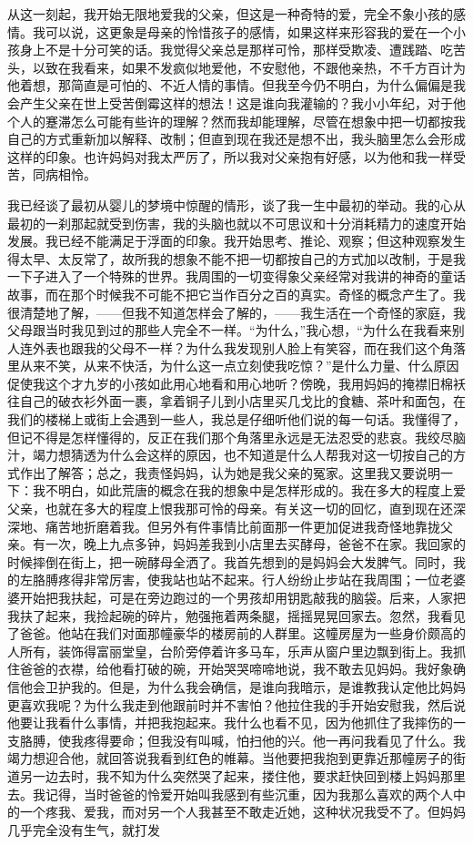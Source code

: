 \documentclass[12pt, UTF8]{ctexbook}
\begin{document}
\par 从这一刻起，我开始无限地爱我的父亲，但这是一种奇特的爱，完全不象小孩的感情。我可以说，这更象是母亲的怜惜孩子的感情，如果这样来形容我的爱在一个小孩身上不是十分可笑的话。我觉得父亲总是那样可怜，那样受欺凌、遭践踏、吃苦头，以致在我看来，如果不发疯似地爱他，不安慰他，不跟他亲热，不千方百计为他着想，那简直是可怕的、不近人情的事情。但我至今仍不明白，为什么偏偏是我会产生父亲在世上受苦倒霉这样的想法！这是谁向我灌输的？我小小年纪，对于他个人的蹇滞怎么可能有些许的理解？然而我却能理解，尽管在想象中把一切都按我自己的方式重新加以解释、改制；但直到现在我还是想不出，我头脑里怎么会形成这样的印象。也许妈妈对我太严厉了，所以我对父亲抱有好感，以为他和我一样受苦，同病相怜。
\par 我已经谈了最初从婴儿的梦境中惊醒的情形，谈了我一生中最初的举动。我的心从最初的一刹那起就受到伤害，我的头脑也就以不可思议和十分消耗精力的速度开始发展。我已经不能满足于浮面的印象。我开始思考、推论、观察；但这种观察发生得太早、太反常了，故所我的想象不能不把一切都按自己的方式加以改制，于是我一下子进入了一个特殊的世界。我周围的一切变得象父亲经常对我讲的神奇的童话故事，而在那个时候我不可能不把它当作百分之百的真实。奇怪的概念产生了。我很清楚地了解，——但我不知道怎样会了解的，——我生活在一个奇怪的家庭，我父母跟当时我见到过的那些人完全不一样。“为什么，”我心想，“为什么在我看来别人连外表也跟我的父母不一样？为什么我发现别人脸上有笑容，而在我们这个角落里从来不笑，从来不快活，为什么这一点立刻使我吃惊？”是什么力量、什么原因促使我这个才九岁的小孩如此用心地看和用心地听？傍晚，我用妈妈的掩襟旧棉袄往自己的破衣衫外面一裹，拿着铜子儿到小店里买几戈比的食糖、茶叶和面包，在我们的楼梯上或街上会遇到一些人，我总是仔细听他们说的每一句话。我懂得了，但记不得是怎样懂得的，反正在我们那个角落里永远是无法忍受的悲哀。我绞尽脑汁，竭力想猜透为什么会这样的原因，也不知道是什么人帮我对这一切按自己的方式作出了解答；总之，我责怪妈妈，认为她是我父亲的冤家。这里我又要说明一下：我不明白，如此荒唐的概念在我的想象中是怎样形成的。我在多大的程度上爱父亲，也就在多大的程度上恨我那可怜的母亲。有关这一切的回忆，直到现在还深深地、痛苦地折磨着我。但另外有件事情比前面那一件更加促进我奇怪地靠拢父亲。有一次，晚上九点多钟，妈妈差我到小店里去买酵母，爸爸不在家。我回家的时候摔倒在街上，把一碗酵母全洒了。我首先想到的是妈妈会大发脾气。同时，我的左胳膊疼得非常厉害，使我站也站不起来。行人纷纷止步站在我周围；一位老婆婆开始把我扶起，可是在旁边跑过的一个男孩却用钥匙敲我的脑袋。后来，人家把我扶了起来，我捡起碗的碎片，勉强拖着两条腿，摇摇晃晃回家去。忽然，我看见了爸爸。他站在我们对面那幢豪华的楼房前的人群里。这幢房屋为一些身价颇高的人所有，装饰得富丽堂皇，台阶旁停着许多马车，乐声从窗户里边飘到街上。我抓住爸爸的衣襟，给他看打破的碗，开始哭哭啼啼地说，我不敢去见妈妈。我好象确信他会卫护我的。但是，为什么我会确信，是谁向我暗示，是谁教我认定他比妈妈更喜欢我呢？为什么我走到他跟前时并不害怕？他拉住我的手开始安慰我，然后说他要让我看什么事情，并把我抱起来。我什么也看不见，因为他抓住了我摔伤的一支胳膊，使我疼得要命；但我没有叫喊，怕扫他的兴。他一再问我看见了什么。我竭力想迎合他，就回答说我看到红色的帷幕。当他要把我抱到更靠近那幢房子的街道另一边去时，我不知为什么突然哭了起来，搂住他，要求赶快回到楼上妈妈那里去。我记得，当时爸爸的怜爱开始叫我感到有些沉重，因为我那么喜欢的两个人中的一个疼我、爱我，而对另一个人我甚至不敢走近她，这种状况我受不了。但妈妈几乎完全没有生气，就打发
\end{document}
